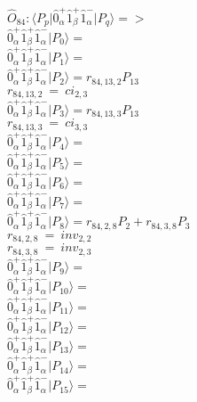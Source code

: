 \documentclass[14pt]{article}
\begin{document}
    $\hat{O}_{84}:  \langle{P_p}\vert \hat{0}_{\alpha}^{+}\hat{1}_{\beta}^{+}\hat{1}_{\alpha}^{-} \vert{P_q}\rangle => $ \\ 
    $ \hat{0}_{\alpha}^{+}\hat{1}_{\beta}^{+}\hat{1}_{\alpha}^{-} \vert{P_{0}}\rangle =  $ \\ 
    $ \hat{0}_{\alpha}^{+}\hat{1}_{\beta}^{+}\hat{1}_{\alpha}^{-} \vert{P_{1}}\rangle =  $ \\ 
    $ \hat{0}_{\alpha}^{+}\hat{1}_{\beta}^{+}\hat{1}_{\alpha}^{-} \vert{P_{2}}\rangle = {r}_{84,13,2}P_{13} $ \\ 
    ${r}_{84,13,2}\ =\ {ci}_{2,3} $ \\ 
    $ \hat{0}_{\alpha}^{+}\hat{1}_{\beta}^{+}\hat{1}_{\alpha}^{-} \vert{P_{3}}\rangle = {r}_{84,13,3}P_{13} $ \\ 
    ${r}_{84,13,3}\ =\ {ci}_{3,3} $ \\ 
    $ \hat{0}_{\alpha}^{+}\hat{1}_{\beta}^{+}\hat{1}_{\alpha}^{-} \vert{P_{4}}\rangle =  $ \\ 
    $ \hat{0}_{\alpha}^{+}\hat{1}_{\beta}^{+}\hat{1}_{\alpha}^{-} \vert{P_{5}}\rangle =  $ \\ 
    $ \hat{0}_{\alpha}^{+}\hat{1}_{\beta}^{+}\hat{1}_{\alpha}^{-} \vert{P_{6}}\rangle =  $ \\ 
    $ \hat{0}_{\alpha}^{+}\hat{1}_{\beta}^{+}\hat{1}_{\alpha}^{-} \vert{P_{7}}\rangle =  $ \\ 
    $ \hat{0}_{\alpha}^{+}\hat{1}_{\beta}^{+}\hat{1}_{\alpha}^{-} \vert{P_{8}}\rangle = {r}_{84,2,8}P_{2}+{r}_{84,3,8}P_{3} $ \\ 
    ${r}_{84,2,8}\ =\ {inv}_{2,2} $ \\ 
    ${r}_{84,3,8}\ =\ {inv}_{2,3} $ \\ 
    $ \hat{0}_{\alpha}^{+}\hat{1}_{\beta}^{+}\hat{1}_{\alpha}^{-} \vert{P_{9}}\rangle =  $ \\ 
    $ \hat{0}_{\alpha}^{+}\hat{1}_{\beta}^{+}\hat{1}_{\alpha}^{-} \vert{P_{10}}\rangle =  $ \\ 
    $ \hat{0}_{\alpha}^{+}\hat{1}_{\beta}^{+}\hat{1}_{\alpha}^{-} \vert{P_{11}}\rangle =  $ \\ 
    $ \hat{0}_{\alpha}^{+}\hat{1}_{\beta}^{+}\hat{1}_{\alpha}^{-} \vert{P_{12}}\rangle =  $ \\ 
    $ \hat{0}_{\alpha}^{+}\hat{1}_{\beta}^{+}\hat{1}_{\alpha}^{-} \vert{P_{13}}\rangle =  $ \\ 
    $ \hat{0}_{\alpha}^{+}\hat{1}_{\beta}^{+}\hat{1}_{\alpha}^{-} \vert{P_{14}}\rangle =  $ \\ 
    $ \hat{0}_{\alpha}^{+}\hat{1}_{\beta}^{+}\hat{1}_{\alpha}^{-} \vert{P_{15}}\rangle =  $ \\ 
    
\end{document}
